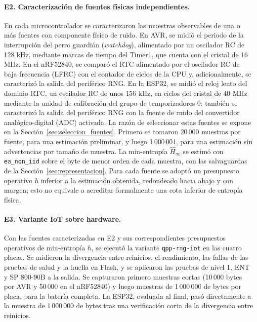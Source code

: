 \paragraph{E2. Caracterización de fuentes físicas independientes.} En cada microcontrolador se caracterizaron las muestras observables de una o más fuentes con componente físico de ruido. En AVR, se midió el periodo de la interrupción del perro guardián (\textit{watchdog}), alimentado por un oscilador RC de 128 kHz, mediante marcas de tiempo del Timer1, que cuenta con el cristal de 16 MHz. En el nRF52840, se comparó el RTC alimentado por el oscilador RC de baja frecuencia (LFRC) con el contador de ciclos de la CPU y, adicionalmente, se caracterizó la salida del periférico RNG. En la ESP32, se midió el reloj lento del dominio RTC, un oscilador RC de unos 156 kHz, en ciclos del cristal de 40 MHz mediante la unidad de calibración del grupo de temporizadores 0; también se caracterizó la salida del periférico RNG con la fuente de ruido del convertidor analógico-digital (ADC) activada. La razón de seleccionar estas fuentes se expone en la Sección~\ref{sec:seleccion_fuentes}. Primero se tomaron 20\,000 muestras por fuente, para una estimación preliminar, y luego 1\,000\,001, para una estimación sin advertencias por tamaño de muestra. La min-entropía $\hat{H}_\infty$ se estimó con \texttt{ea\_non\_iid} sobre el byte de menor orden de cada muestra, con las salvaguardas de la Sección~\ref{sec:representacion}. Para cada fuente se adoptó un presupuesto operativo $h$ inferior a la estimación obtenida, redondeado hacia abajo y con margen; esto no equivale a acreditar formalmente una cota inferior de entropía física.

\paragraph{E3. Variante IoT sobre hardware.} Con las fuentes caracterizadas en E2 y sus correspondientes presupuestos operativos de min-entropía $h$, se ejecutó la variante \texttt{qpp-rng-iot} en las cuatro placas. Se midieron la divergencia entre reinicios, el rendimiento, las fallas de las pruebas de salud y la huella en Flash, y se aplicaron las pruebas de nivel 1, ENT y SP 800-90B a la salida. Se capturaron primero muestras cortas (10\,000 bytes por AVR y 50\,000 en el nRF52840) y luego muestras de 1\,000\,000 de bytes por placa, para la batería completa. La ESP32, evaluada al final, pasó directamente a la muestra de 1\,000\,000 de bytes tras una verificación corta de la divergencia entre reinicios.

